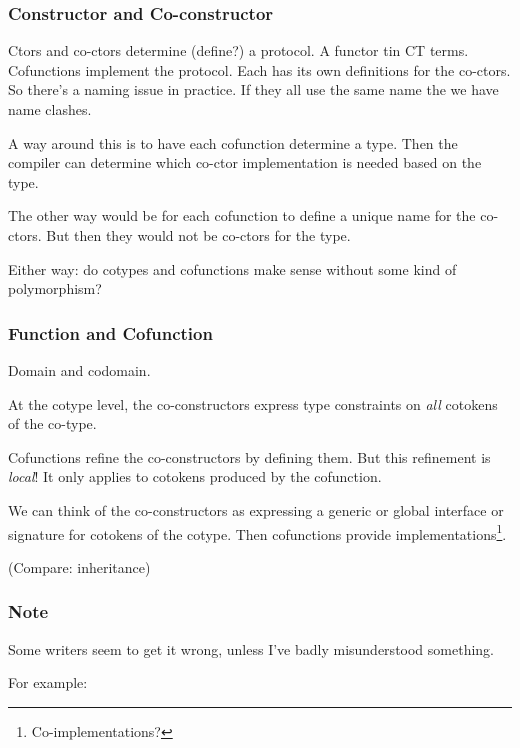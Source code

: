 \subsubsection{Constructor and Co-constructor}

Ctors and co-ctors determine (define?) a protocol. A functor tin CT
terms. Cofunctions implement the protocol. Each has its own
definitions for the co-ctors. So there's a naming issue in practice.
If they all use the same name the we have name clashes.

A way around this is to have each cofunction determine a type. Then
the compiler can determine which co-ctor implementation is needed
based on the type.

The other way would be for each cofunction to define a unique name for
the co-ctors. But then they would not be co-ctors for the type.

Either way: do cotypes and cofunctions make sense without some kind of
polymorphism?

\subsubsection{Function and Cofunction}

Domain and codomain.

At the cotype level, the co-constructors express type constraints on
\textit{all} cotokens of the co-type.

Cofunctions refine the co-constructors by defining them. But this
refinement is \textit\textit{local}! It only applies to cotokens
produced by the cofunction.

We can think of the co-constructors as expressing a generic or global
interface or signature for cotokens of the cotype. Then cofunctions
provide implementations\footnote{Co-implementations?}.

(Compare: inheritance)

\subsubsection{Note}

Some writers seem to get it wrong, unless I've badly misunderstood something.

For example:

